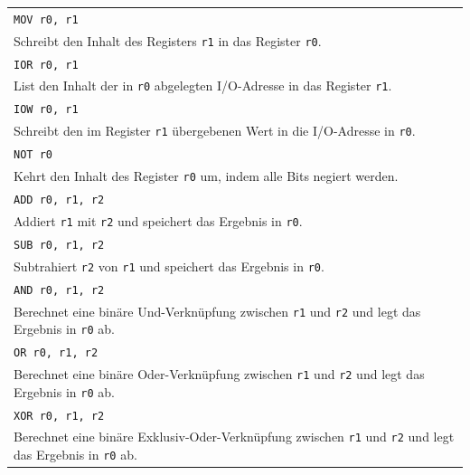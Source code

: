 {\begin{longtable}{|p{\textwidth}|}
        \hline
        \verb|MOV r0, r1| \\
        Schreibt den Inhalt des Registers \texttt{r1} in das Register \texttt{r0}.
        \\

        \hline
        \hline

        \hline
        \verb|IOR r0, r1| \\
        List den Inhalt der in \texttt{r0} abgelegten I/O-Adresse in das Register
        \texttt{r1}.
        \\

        \hline
        \verb|IOW r0, r1| \\
        Schreibt den im Register \texttt{r1} übergebenen Wert in die I/O-Adresse
        in \texttt{r0}.
        \\

        \hline
        \hline

        \hline
        \verb|NOT r0| \\
        Kehrt den Inhalt des Register \texttt{r0} um, indem alle Bits negiert werden.
        \\

        \hline
        \verb|ADD r0, r1, r2| \\
        Addiert \texttt{r1} mit \texttt{r2} und speichert das Ergebnis in \texttt{r0}.
        \\

        \hline
        \verb|SUB r0, r1, r2| \\
        Subtrahiert \texttt{r2} von \texttt{r1} und speichert das Ergebnis in \texttt{r0}.
        \\

        \hline
        \verb|AND r0, r1, r2| \\
        Berechnet eine binäre Und-Verknüpfung zwischen \texttt{r1} und \texttt{r2}
        und legt das Ergebnis in \texttt{r0} ab.
        \\

        \hline
        \verb|OR r0, r1, r2| \\
        Berechnet eine binäre Oder-Verknüpfung zwischen \texttt{r1} und \texttt{r2}
        und legt das Ergebnis in \texttt{r0} ab.
        \\

        \hline
        \verb|XOR r0, r1, r2| \\
        Berechnet eine binäre Exklusiv-Oder-Verknüpfung zwischen \texttt{r1} und
        \texttt{r2} und legt das Ergebnis in \texttt{r0} ab.
        \\


\end{longtable}}
